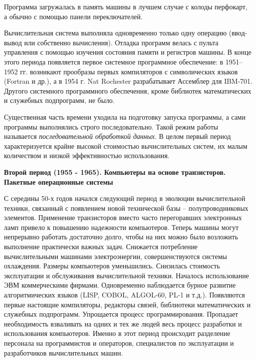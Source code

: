 Программа загружалась в память машины в лучшем случае с колоды перфокарт, а обычно с помощью панели переключателей.

Вычислительная система выполняла одновременно только одну операцию (ввод-вывод или собственно вычисления). Отладка программ велась с пульта управления с помощью изучения состояния памяти и регистров машины. В конце этого периода появляется первое системное программное обеспечение: в 1951–1952 гг. возникают прообразы первых компиляторов с символических языков (Fortran и др.), а в 1954 г. Nat Rochester разрабатывает Ассемблер для IBM-701. Другого системного программного обеспечения, кроме библиотек математических и служебных подпрограмм, не было.

Существенная часть времени уходила на подготовку запуска программы, а сами программы выполнялись строго последовательно. Такой режим работы называется \textit{последовательной обработкой данных}. В целом первый период характеризуется крайне высокой стоимостью вычислительных систем, их малым количеством и низкой эффективностью использования.

\textbf{Второй период (1955 - 1965). Компьютеры на основе транзисторов. Пакетные операционные системы}

С середины 50-х годов начался следующий период в эволюции вычислительной техники, связанный с появлением новой технической базы – полупроводниковых элементов. Применение транзисторов вместо часто перегоравших электронных ламп привело к повышению надежности компьютеров. Теперь машины могут непрерывно работать достаточно долго, чтобы на них можно было возложить выполнение практически важных задач. Снижается потребление вычислительными машинами электроэнергии, совершенствуются системы охлаждения. Размеры компьютеров уменьшились. Снизилась стоимость эксплуатации и обслуживания вычислительной техники. Началось использование ЭВМ коммерческими фирмами. Одновременно наблюдается бурное развитие алгоритмических языков (LISP, COBOL, ALGOL-60, PL-1 и т.д.). Появляются первые настоящие компиляторы, редакторы связей, библиотеки математических и служебных подпрограмм. Упрощается процесс программирования. Пропадает необходимость взваливать на одних и тех же людей весь процесс разработки и использования компьютеров. Именно в этот период происходит разделение персонала на программистов и операторов, специалистов по эксплуатации и разработчиков вычислительных машин.


